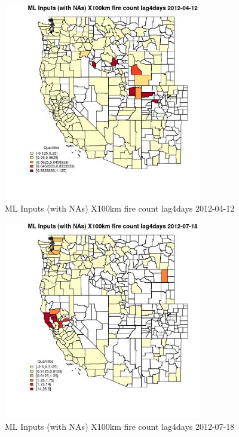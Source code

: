 \begin{figure} 
\centering  
\includegraphics[width=0.77\textwidth]{Code_Outputs/Report_ML_input_PM25_Step4_part_e_de_duplicated_aves_compiled_2019-05-14wNAs_CountyX100km_fire_count_lag4daysMean2012-04-12_2012-04-12.jpg} 
\caption{\label{fig:Report_ML_input_PM25_Step4_part_e_de_duplicated_aves_compiled_2019-05-14wNAsCountyX100km_fire_count_lag4daysMean2012-04-12_2012-04-12}ML Inputs (with NAs) X100km fire count lag4days 2012-04-12} 
\end{figure} 
 

\begin{figure} 
\centering  
\includegraphics[width=0.77\textwidth]{Code_Outputs/Report_ML_input_PM25_Step4_part_e_de_duplicated_aves_compiled_2019-05-14wNAs_CountyX100km_fire_count_lag4daysMean2012-07-18_2012-07-18.jpg} 
\caption{\label{fig:Report_ML_input_PM25_Step4_part_e_de_duplicated_aves_compiled_2019-05-14wNAsCountyX100km_fire_count_lag4daysMean2012-07-18_2012-07-18}ML Inputs (with NAs) X100km fire count lag4days 2012-07-18} 
\end{figure} 
 

